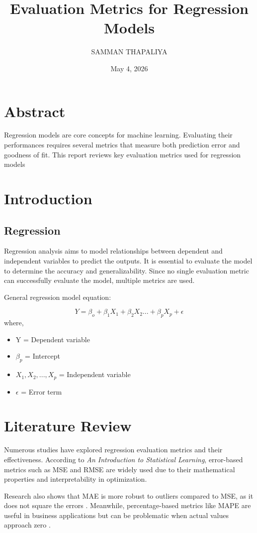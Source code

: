 \documentclass{article}
\title{Evaluation Metrics for Regression Models}
\author{SAMMAN THAPALIYA}
\date{May 4,  2026}
\begin{document}
\maketitle

\section*{Abstract}
Regression models are core concepts for machine learning. Evaluating their performances requires several metrics that measure both prediction error and goodness of fit. This report reviews key evaluation metrics used for regression models
\section{Introduction}
\subsection{Regression}
Regression analysis aims to model relationships between dependent and independent variables to predict the outputs. It is essential to evaluate the model to determine the accuracy and generalizability. Since no single evaluation metric can successfully evaluate the model, multiple metrics are used.


General regression model equation:

\begin{equation}
    Y = \beta_o + \beta_1X_1 + \beta_2X_2 ... + \beta_pX_p + \epsilon
\end{equation}
where,
\begin{itemize}
    \item Y = Dependent variable
    \item  $\beta_p$ = Intercept 
    \item   $X_1, X_2, ..., X_p$ = Independent variable
    \item $\epsilon$ = Error term
\end{itemize}
\newpage
\section{Literature Review}

Numerous studies have explored regression evaluation metrics and their effectiveness. According to \textit{An Introduction to Statistical Learning}, error-based metrics such as MSE and RMSE are widely used due to their mathematical properties and interpretability in optimization.

Research also shows that MAE is more robust to outliers compared to MSE, as it does not square the errors \cite{willmott2005}. Meanwhile, percentage-based metrics like MAPE are useful in business applications but can be problematic when actual values approach zero \cite{hyndman2006}.
\end{document}
